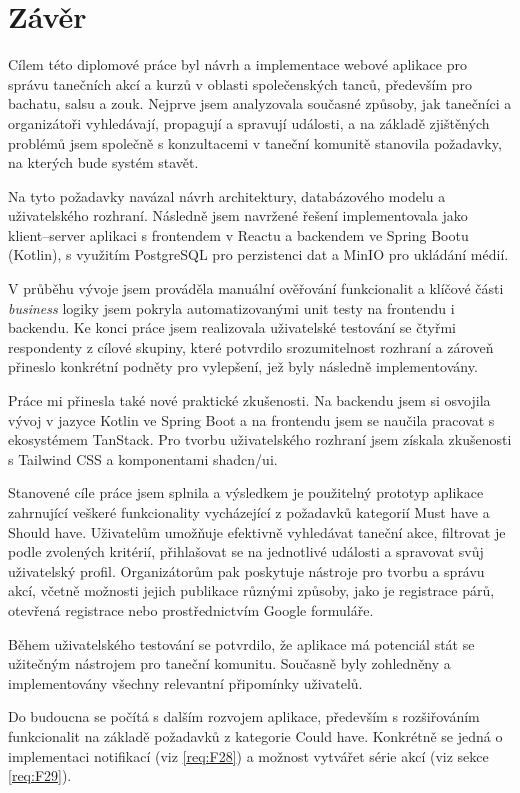 \chapter{Závěr}

Cílem této diplomové práce byl návrh a implementace webové aplikace pro správu tanečních akcí a kurzů v oblasti společenských tanců, především pro bachatu, salsu a zouk. Nejprve jsem analyzovala současné způsoby, jak tanečníci a organizátoři vyhledávají, propagují a spravují události, a na základě zjištěných problémů jsem společně s konzultacemi v taneční komunitě stanovila požadavky, na kterých bude systém stavět.

Na tyto požadavky navázal návrh architektury, databázového modelu a uživatelského rozhraní. Následně jsem navržené řešení implementovala jako klient--server aplikaci s frontendem v Reactu a backendem ve Spring Bootu (Kotlin), s využitím PostgreSQL pro perzistenci dat a MinIO pro ukládání médií.

V průběhu vývoje jsem prováděla manuální ověřování funkcionalit a klíčové části \textit{business} logiky jsem pokryla automatizovanými unit testy na frontendu i backendu. Ke konci práce jsem realizovala uživatelské testování se čtyřmi respondenty z cílové skupiny, které potvrdilo srozumitelnost rozhraní a zároveň přineslo konkrétní podněty pro vylepšení, jež byly následně implementovány.

Práce mi přinesla také nové praktické zkušenosti. Na backendu jsem si osvojila vývoj v jazyce Kotlin ve Spring Boot a na frontendu jsem se naučila pracovat s ekosystémem TanStack. Pro tvorbu uživatelského rozhraní jsem získala zkušenosti s Tailwind CSS a komponentami shadcn/ui.

Stanovené cíle práce jsem splnila a výsledkem je použitelný prototyp aplikace zahrnující veškeré funkcionality vycházející z požadavků kategorií Must have a Should have. Uživatelům umožňuje efektivně vyhledávat taneční akce, filtrovat je podle zvolených kritérií, přihlašovat se na jednotlivé události a spravovat svůj uživatelský profil. Organizátorům pak poskytuje nástroje pro tvorbu a správu akcí, včetně možnosti jejich publikace různými způsoby, jako je registrace párů, otevřená registrace nebo prostřednictvím Google formuláře.

Během uživatelského testování se potvrdilo, že aplikace má potenciál stát se užitečným nástrojem pro taneční komunitu. Současně byly zohledněny a implementovány všechny relevantní připomínky uživatelů.

Do budoucna se počítá s dalším rozvojem aplikace, především s rozšiřováním funkcionalit na základě požadavků z kategorie Could have. Konkrétně se jedná o implementaci notifikací (viz \ref{req:F28}) a možnost vytvářet série akcí (viz sekce \ref{req:F29}).

